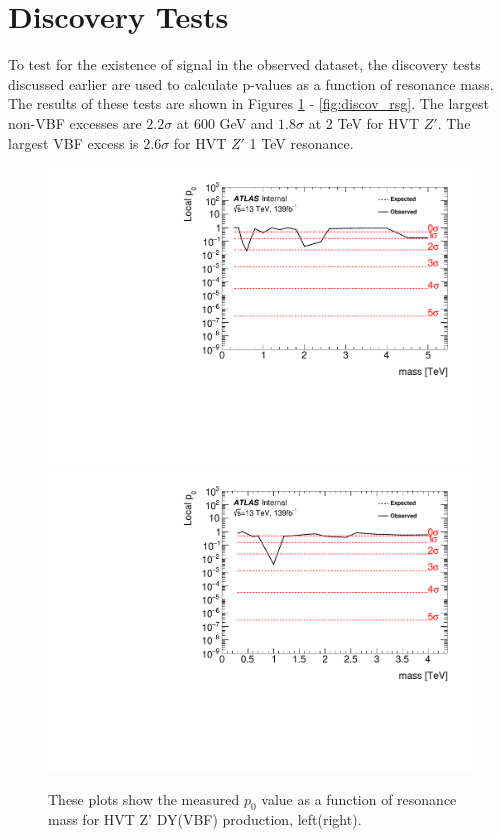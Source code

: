\section{Discovery Tests}
\label{discovery}
To test for the existence of signal in the observed dataset, the discovery tests discussed earlier are used to calculate p-values as a function of resonance mass. The results of these tests are shown in Figures \ref{fig:discov_hvtww} - \ref{fig:discov_rsg}. The largest non-VBF excesses are $2.2\sigma$ at 600 GeV and $1.8\sigma$ at 2 TeV for HVT $Z'$. The largest VBF excess is $2.6\sigma$ for HVT $Z'$ 1 TeV resonance. 
 \begin{figure}[h!]
  \centering
  \includegraphics[width=0.48\hsize]{figures/results/pvalues/fixed_pvalues/hvtww_pvalue.pdf}
    \includegraphics[width=0.48\hsize]{figures/results/pvalues/fixed_pvalues/hvtwwvbf_pvalue.pdf}
 \caption{These plots show the measured $p_{0}$ value as a function of resonance mass for HVT Z' DY(VBF) production, left(right).} 
  \label{fig:discov_hvtww}
\end{figure} 
\FloatBarrier


